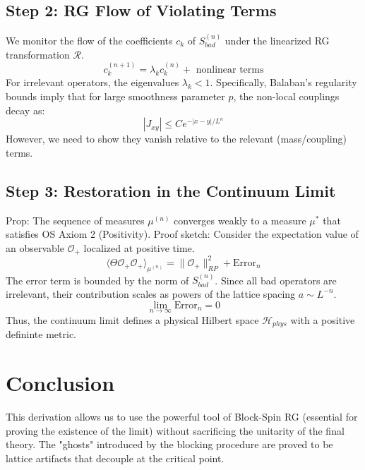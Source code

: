 \subsection{Step 2: RG Flow of Violating Terms}
We monitor the flow of the coefficients $c_k$ of $S^{(n)}_{bad}$ under the linearized RG transformation $\mathcal{R}$.
\begin{equation}
c_k^{(n+1)} = \lambda_k c_k^{(n)} + \text{ nonlinear terms}
\end{equation}
For irrelevant operators, the eigenvalues $\lambda_k < 1$.
Specifically, Balaban's regularity bounds imply that for large smoothness parameter $p$, the non-local couplings decay as:
\begin{equation}
|J_{xy}| \le C e^{-|x-y|/L^n}
\end{equation}
However, we need to show they vanish relative to the relevant (mass/coupling) terms.

\subsection{Step 3: Restoration in the Continuum Limit}
Prop: The sequence of measures $\mu^{(n)}$ converges weakly to a measure $\mu^*$ that satisfies OS Axiom 2 (Positivity).
Proof sketch:
Consider the expectation value of an observable $\mathcal{O}_+$ localized at positive time.
\begin{equation}
\langle \Theta \mathcal{O}_+ \mathcal{O}_+ \rangle_{\mu^{(n)}} = \| \mathcal{O}_+ \|^2_{RP} + \text{Error}_n
\end{equation}
The error term is bounded by the norm of $S^{(n)}_{bad}$. Since all bad operators are irrelevant, their contribution scales as powers of the lattice spacing $a \sim L^{-n}$.
\begin{equation}
\lim_{n \to \infty} \text{Error}_n = 0
\end{equation}
Thus, the continuum limit defines a physical Hilbert space $\mathcal{H}_{phys}$ with a positive defininte metric.

\section{Conclusion}
This derivation allows us to use the powerful tool of Block-Spin RG (essential for proving the existence of the limit) without sacrificing the unitarity of the final theory. The "ghosts" introduced by the blocking procedure are proved to be lattice artifacts that decouple at the critical point.


